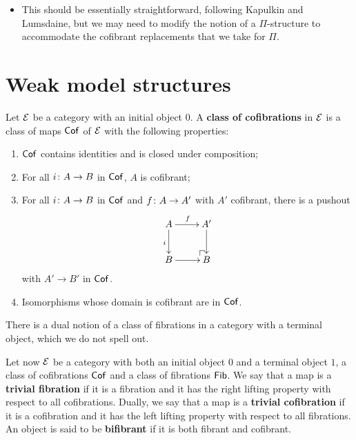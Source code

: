 \documentclass[reqno,10pt,a4paper,oneside,draft]{amsart}
\begin{document}
\begin{itemize}
\item This should be essentially straightforward, following Kapulkin and Lumsdaine, but we may need to modify the notion of a $\Pi$-structure to accommodate the cofibrant replacements that we take for $\Pi$.
\end{itemize}

\appendix

\section{Weak model structures} 

Let $\cal{E}$ be a category with an initial object $0$. A {\bf class of cofibrations} in $\cal{E}$ is
a class of maps $\Cof$ of $\cal{E}$ with the following properties:
\begin{enumerate}[(C1)]
\item $\Cof$ contains identities and is closed under composition;
\item For all $i \co A \to B$ in $\Cof$, $A$ is cofibrant;
\item For all $i \co A \to B$ in $\Cof$ and $f \co A \to A'$ with $A'$ cofibrant, there is a pushout
\[
\xymatrix{
A \ar[r]^f \ar[d]_{i}  & A' \ar[d] \\
B \ar[r] & \ulpullback B }
\]
with $A' \to B'$ in $\Cof$.
\item Isomorphisms whose domain is cofibrant are in $\Cof$.
\end{enumerate}
There is a dual notion of a class of fibrations in a category with a terminal object, which we do
not spell out.

\medskip

Let now $\cal{E}$ be a category with both an initial object $0$ and a terminal object $1$,
a class of cofibrations $\Cof$ and a class of fibrations $\Fib$. We say that a map is a {\bf trivial fibration}
if it is a fibration and it has the right lifting property with respect to all cofibrations. Dually, we say that
a map is a {\bf trivial cofibration} if it is a cofibration and it has the left lifting property with respect to
all fibrations. An object is said to be {\bf bifibrant} if it is both fibrant and cofibrant.
\end{document}
